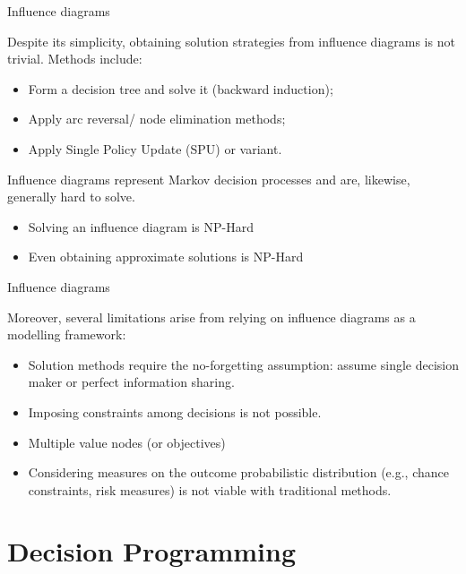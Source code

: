 \documentclass[mathserif,aspectratio=149]{beamer}
\begin{document}
\begin{frame}{Influence diagrams}

Despite its simplicity, obtaining solution \alert{strategies} from influence diagrams is not trivial. Methods include:
%
\begin{itemize}
    \item Form a \alert{decision tree} and solve it (backward induction);
    \item Apply arc reversal/ node elimination methods;
    \item Apply \alert{Single Policy Update} (SPU) \citep{lauritzen2001} or variant.
\end{itemize}

\pause
Influence diagrams represent \alert{Markov decision processes} and are, likewise, generally \alert{hard to solve}.
%
\begin{itemize}
    \item Solving an influence diagram is NP-Hard \citep{maua2013}
    \item Even obtaining approximate solutions is NP-Hard \citep{maua2014}
\end{itemize}
 
\end{frame}


\begin{frame}{Influence diagrams}

Moreover, several \alert{limitations} arise from relying on influence diagrams as a modelling framework:
\begin{itemize}[<+->]
    \item Solution methods require the \alert{no-forgetting} assumption: assume single decision maker or perfect information sharing.
    \item Imposing \alert{constraints} among decisions is not possible.
    \item Multiple value nodes (or objectives)
    \item Considering \alert{measures on the outcome probabilistic distribution} (e.g., chance constraints, risk measures) is not viable with traditional methods.
\end{itemize}

\end{frame}



\section{Decision Programming}
\end{document}
